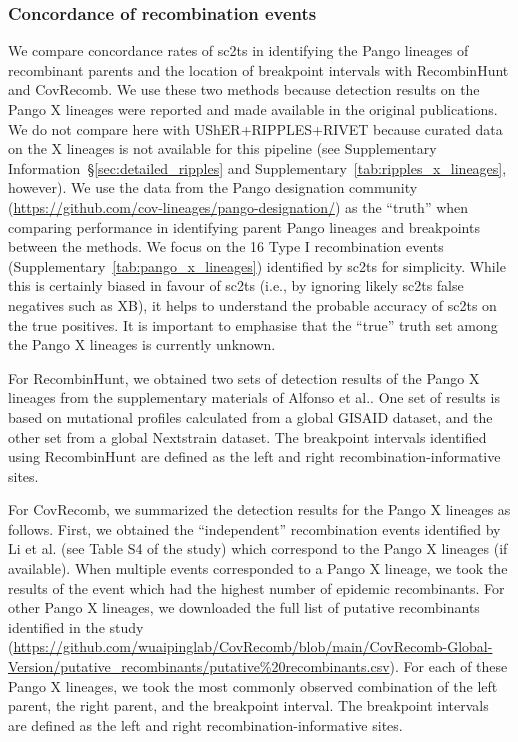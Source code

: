 \documentclass[12pt]{article}
\newcommand{\supref}[1]{Supplementary Information~\S\ref{#1}}
\newcommand{\siref}[1]{Supplementary~\ref{#1}}
\begin{document}
\subsubsection*{Concordance of recombination events}
We compare concordance rates of sc2ts in identifying the
Pango lineages of recombinant parents and the location
of breakpoint intervals with RecombinHunt\cite{Alfonsi2024} and
CovRecomb\cite{Zhou2023virusrecom}.
We use these two methods because detection
results on the Pango X lineages were reported and made available
in the original publications. We do not compare here with
UShER+RIPPLES+RIVET because curated data on the X lineages is
not available for this pipeline (see \supref{sec:detailed_ripples}
and \siref{tab:ripples_x_lineages}, however).
We use the data from the Pango designation community
(\url{https://github.com/cov-lineages/pango-designation/})
as the ``truth'' when comparing performance in identifying
parent Pango lineages and breakpoints between the methods.
We focus on the 16 Type I recombination events
(\siref{tab:pango_x_lineages}) identified by sc2ts for simplicity.
While this is certainly biased in favour of sc2ts (i.e., by
ignoring likely sc2ts false negatives such as XB), it helps to
understand the probable accuracy of sc2ts on the true positives.
It is important to emphasise that the ``true'' truth set among
the Pango X lineages is currently unknown.

For RecombinHunt, we obtained two sets of detection results of the Pango X lineages
from the supplementary materials of Alfonso et al.\cite{Alfonsi2024}.
One set of results is based on mutational profiles calculated from a global GISAID dataset,
and the other set from a global Nextstrain dataset.
The breakpoint intervals identified using RecombinHunt are defined
as the left and right recombination-informative sites.

For CovRecomb, we summarized the detection results for the Pango X lineages as follows.
First, we obtained the ``independent'' recombination events
identified by Li et al.\cite{Li2024CovRecomb} (see Table S4 of the study)
which correspond to the Pango X lineages (if available).
When multiple events corresponded to a Pango X lineage,
we took the results of the event which had the highest number of epidemic recombinants.
For other Pango X lineages, we downloaded the full list of putative recombinants
identified in the study
(\url{https://github.com/wuaipinglab/CovRecomb/blob/main/CovRecomb-Global-Version/putative\_recombinants/putative\%20recombinants.csv}).
For each of these Pango X lineages,
we took the most commonly observed combination of
the left parent, the right parent, and the breakpoint interval.
The breakpoint intervals are defined as the left and right recombination-informative sites.
\end{document}
